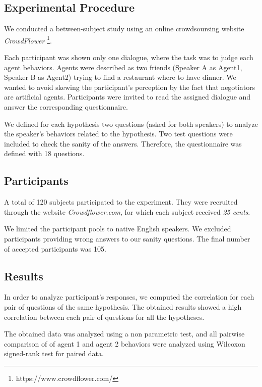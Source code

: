 \documentclass{llncs}
\begin{document}
				\subsection{Experimental Procedure}
				
				We conducted a between-subject study using an online crowdsoursing website \emph{CrowdFlower} \footnote{https://www.crowdflower.com/}. 
				
				
				Each participant was shown only one dialogue, where the task was to judge each agent behaviors. Agents were described as two friends (Speaker A as Agent1, Speaker B as Agent2) trying to find a restaurant where to have dinner. We wanted to avoid skewing the participant's perception by the fact that negotiators are artificial agents. Participants were invited to read the assigned dialogue and answer the corresponding questionnaire. 
				
				We defined for each hypothesis two questions (asked for both speakers) to analyze the speaker's behaviors related to the hypothesis. 
				Two test questions were included to check the sanity of the answers. Therefore, the questionnaire was defined with 18 questions.
				
				\subsection{Participants}
				A total of 120 subjects participated to the experiment. They were recruited through the website \emph{Crowdflower.com}, for which each subject received \textit{25 cents}. 
				
				We limited the participant pools to native English speakers. We excluded participants providing wrong answers to our sanity questions. The final number of accepted participants was 105. 
				
				\subsection{Results}
				 In order to analyze participant's responses, we computed the correlation for each pair of questions of the same hypothesis. The obtained results showed a high correlation between each pair of questions for all the hypotheses.
				
				The obtained data was analyzed using a non parametric test, and all pairwise comparison of of agent 1 and agent 2 behaviors were analyzed using Wilcoxon signed-rank test for paired data. 
				
\end{document}
